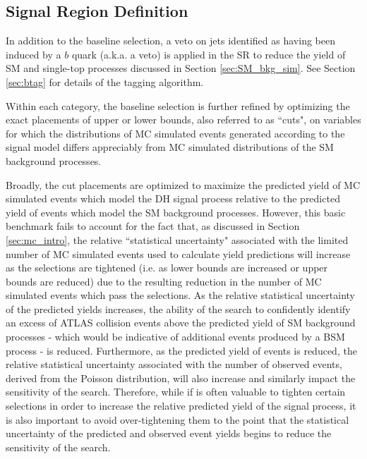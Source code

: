 \subsection{Signal Region Definition}
\label{sec:sr_selection}

In addition to the baseline selection, a veto on jets identified as having been induced by a \(b\) quark (a.k.a. a \bjet veto) is applied in the SR to reduce the yield of SM \ttbar and single-top processes discussed in Section \ref{sec:SM_bkg_sim}. See Section \ref{sec:btag} for details of the \bjet tagging algorithm. 


Within each category, the baseline selection is further refined by optimizing the exact placements of upper or lower bounds, also referred to as ``cuts", on variables for which the distributions of MC simulated events generated according to the signal model differs appreciably from MC simulated distributions of the SM background processes.

Broadly, the cut placements are optimized to maximize the predicted yield of MC simulated events which model the DH signal process relative to the predicted yield of events which model the SM background processes. However, this basic benchmark fails to account for the fact that, as discussed in Section \ref{sec:mc_intro}, the relative ``statistical uncertainty" associated with the limited number of MC simulated events used to calculate yield predictions will increase as the selections are tightened (i.e. as lower bounds are increased or upper bounds are reduced) due to the resulting reduction in the number of MC simulated events which pass the selections. As the relative statistical uncertainty of the predicted yields increases, the ability of the search to confidently identify an excess of ATLAS collision events above the predicted yield of SM background processes - which would be indicative of additional events produced by a BSM process - is reduced. Furthermore, as the predicted yield of events is reduced, the relative statistical uncertainty associated with the number of observed events, derived from the Poisson distribution, will also increase and similarly impact the sensitivity of the search. Therefore, while if is often valuable to tighten certain selections in order to increase the relative predicted yield of the signal process, it is also important to avoid over-tightening them to the point that the statistical uncertainty of the predicted and observed event yields begins to reduce the sensitivity of the search. 

